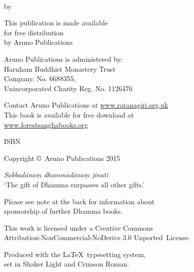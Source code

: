
\cleartoverso
\thispagestyle{empty}

{\copyrightsize
\centering
\setlength{\parindent}{0pt}%
\setlength{\parskip}{0.8\baselineskip}%

\thetitle\\
by \theauthor

This publication is made available\\
for free distribution\\
by Aruno Publications

Aruno Publications is administered by:\\
Harnham Buddhist Monastery Trust\\
Company. No. 6688355,\\
Unincorporated Charity Reg. No. 1126476

Contact Aruno Publications at \href{http://ratanagiri.org.uk/}{www.ratanagiri.org.uk}\\
This book is available for free download at\\
\href{http://forestsanghabooks.org/}{www.forestsanghabooks.org}

ISBN \theISBN

Copyright \copyright\ Aruno Publications 2015

\vfill

\textit{Sabbadānaṃ dhammadānaṃ jinati}\\
‘The gift of Dhamma surpasses all other gifts.’


Please see note at the back for information about\\
sponsorship of further Dhamma books.

This work is licensed under a Creative Commons\\
Attribution-NonCommercial-NoDerivs 3.0 Unported~License.



Produced with the \LaTeX\ typesetting system,\\
set in Shaker Light and Crimson Roman.

\theEditionInfo

}
